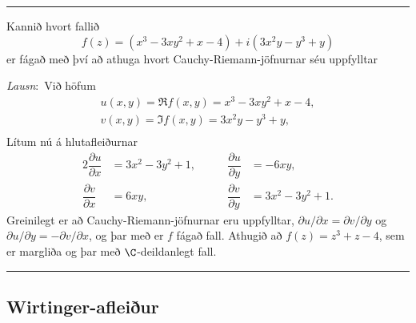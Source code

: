 \bigskip\hrule\bigskip

\begin{sy}  Kannið hvort fallið 
$$
f(z)=(x^3-3xy^2+x-4)+i(3x^2y-y^3+y)
$$
 er fágað með því að athuga hvort
Cauchy-Riemann-jöfnurnar séu uppfylltar

\smallskip\noindent
{\it Lausn}:\   Við höfum
\begin{gather*}
u(x,y)=\Re f(x,y)=x^3-3xy^2+x-4,\\
v(x,y)=\Im f(x,y)=3x^2y-y^3+y,\\
\end{gather*}
Lítum nú á hlutafleiðurnar
\begin{alignat*}{2}
\dfrac{{\partial} u}{{\partial} x}&= 3x^2-3y^2+1, & \qquad
\dfrac{{\partial} u}{{\partial} y}&= -6xy,\\ 
\dfrac{{\partial} v}{{\partial} x}&= 6xy, &\qquad
\dfrac{{\partial} v}{{\partial} y}&= 3x^2-3y^2+1.
\end{alignat*}
Greinilegt er að Cauchy-Riemann-jöfnurnar eru uppfylltar,
${\partial} u/{\partial}x={\partial}v/{\partial}y$ og
${\partial} u/{\partial}y=-{\partial}v/{\partial}x$, og þar með er $f$
fágað fall. Athugið að $f(z)=z^3+z-4$, sem er margliða og þar með
$\C$-deildanlegt fall.
\end{sy}

\bigskip\hrule\bigskip

\subsection*{Wirtinger-afleiður}


